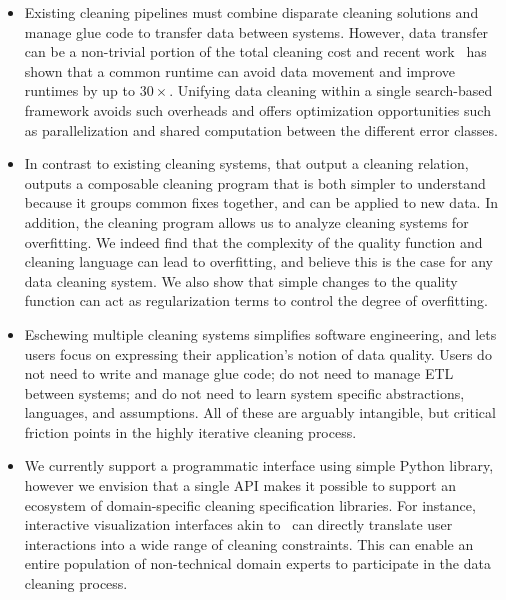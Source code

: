 \begin{itemize}[leftmargin=*, topsep=0mm, itemsep=0mm]
\item {} Existing cleaning pipelines must combine disparate cleaning solutions and manage glue code to transfer data between systems.  However, data transfer can be a non-trivial portion of the total cleaning cost and recent work~\cite{palkar2017weld} has shown that a common runtime can avoid data movement and improve runtimes by up to $30\times$.  Unifying data cleaning within a single search-based framework avoids such overheads and offers optimization opportunities such as parallelization and shared computation between the different error classes.

\item {} In contrast to existing cleaning systems, that output a cleaning relation, \sys outputs a composable cleaning program that is both simpler to understand because it groups common fixes together, and can be applied to new data.  In addition, the cleaning program allows us to analyze cleaning systems for overfitting.  We indeed find that the complexity of the quality function and cleaning language can lead to overfitting, and believe this is the case for any data cleaning system.  We also show that simple changes to the quality function can act as regularization terms to control the degree of overfitting.

\item {} Eschewing multiple cleaning systems simplifies software engineering, and lets users focus on expressing their application's notion of data quality.  Users do not need to write and manage glue code; do not need to manage ETL between systems; and do not need to learn system specific abstractions, languages, and assumptions.  All of these are arguably intangible, but critical friction points in the highly iterative cleaning process.  

\item {} We currently support a programmatic interface using simple Python library, however we envision that a single API makes it possible to support an ecosystem of domain-specific cleaning specification libraries.  For instance,  interactive visualization interfaces akin to~\cite{trifacta,kandel2011wrangler,DBLP:journals/pvldb/0002M13,wu2012demonstration} can directly translate user interactions into a wide range of cleaning constraints.   This can enable an entire population of non-technical domain experts to participate in the data cleaning process.
\end{itemize}

